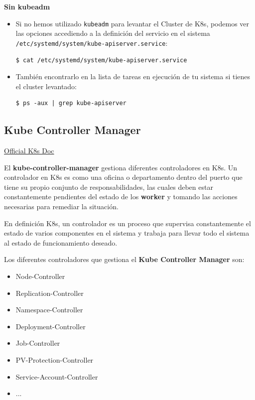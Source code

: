 \documentclass{article}
\newenvironment{codetemplate}[1][]{%
  \mybasecolorbox[#1]
  \itshape
}{%
  \endmybasecolorbox
}
\begin{document}
\textbf{Sin kubeadm}
\begin{itemize}
    \item Si no hemos utilizado \verb|kubeadm| para levantar el Cluster de K8s, podemos ver las opciones accediendo a la definición del servicio en el sistema \verb|/etc/systemd/system/kube-apiserver.service|:
\begin{codetemplate}{}
\begin{verbatim}
$ cat /etc/systemd/system/kube-apiserver.service
\end{verbatim}
\end{codetemplate}

    \item También encontrarlo en la lista de tareas en ejecución de tu sistema si tienes el cluster levantado:
\begin{codetemplate}{}
\begin{verbatim}
$ ps -aux | grep kube-apiserver
\end{verbatim}
\end{codetemplate}
\end{itemize}

\subsection{Kube Controller Manager}

\href{https://kubernetes.io/docs/reference/command-line-tools-reference/kube-controller-manager/}{Official K8s Doc}

El \textbf{kube-controller-manager} gestiona diferentes controladores en K8s. Un controlador en K8s es como una oficina o departamento dentro del puerto que tiene su propio conjunto de responsabilidades, las cuales deben estar constantemente pendientes del estado de los \textbf{worker} y tomando las acciones necesarias para remediar la situación.

En definición K8s, un controlador es un proceso que supervisa constantemente el estado de varios componentes en el sistema y trabaja para llevar todo el sistema al estado de funcionamiento deseado.

Los diferentes controladores que gestiona el \textbf{Kube Controller Manager} son:

\begin{itemize}
    \item Node-Controller
    \item Replication-Controller
    \item Namespace-Controller
    \item Deployment-Controller
    \item Job-Controller
    \item PV-Protection-Controller
    \item Service-Account-Controller
    \item ...
\end{itemize}
\end{document}
